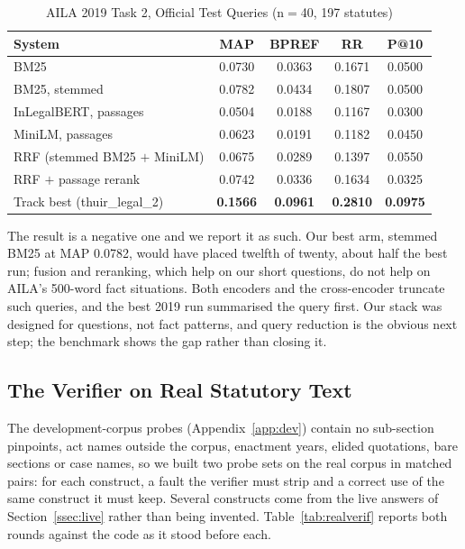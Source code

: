 \documentclass[conference]{IEEEtran}
\begin{document}
\begin{table}[t]
\caption{AILA 2019 Task 2, Official Test Queries (n$=$40, 197 statutes)}
\label{tab:aila}
\centering
\footnotesize
\setlength{\tabcolsep}{4pt}
\begin{tabular}{@{}lcccc@{}}
\toprule
\textbf{System} & \textbf{MAP} & \textbf{BPREF} & \textbf{RR} & \textbf{P@10} \\
\midrule
BM25                          & 0.0730 & 0.0363 & 0.1671 & 0.0500 \\
BM25, stemmed                 & 0.0782 & 0.0434 & 0.1807 & 0.0500 \\
InLegalBERT, passages         & 0.0504 & 0.0188 & 0.1167 & 0.0300 \\
MiniLM, passages              & 0.0623 & 0.0191 & 0.1182 & 0.0450 \\
RRF (stemmed BM25 $+$ MiniLM) & 0.0675 & 0.0289 & 0.1397 & 0.0550 \\
RRF $+$ passage rerank        & 0.0742 & 0.0336 & 0.1634 & 0.0325 \\
\addlinespace
Track best (thuir\_legal\_2)  & \textbf{0.1566} & \textbf{0.0961} & \textbf{0.2810} & \textbf{0.0975} \\
\bottomrule
\end{tabular}
\end{table}

The result is a negative one and we report it as such. Our best arm, stemmed BM25 at MAP 0.0782, would have placed twelfth of twenty, about half the best run; fusion and reranking, which help on our short questions, do not help on AILA's 500-word fact situations. Both encoders and the cross-encoder truncate such queries, and the best 2019 run summarised the query first. Our stack was designed for questions, not fact patterns, and query reduction is the obvious next step; the benchmark shows the gap rather than closing it.

\subsection{The Verifier on Real Statutory Text}
\label{ssec:realverif}

The development-corpus probes (Appendix~\ref{app:dev}) contain no sub-section pinpoints, act names outside the corpus, enactment years, elided quotations, bare sections or case names, so we built two probe sets on the real corpus in matched pairs: for each construct, a fault the verifier must strip and a correct use of the same construct it must keep. Several constructs come from the live answers of Section~\ref{ssec:live} rather than being invented. Table~\ref{tab:realverif} reports both rounds against the code as it stood before each.
\end{document}
